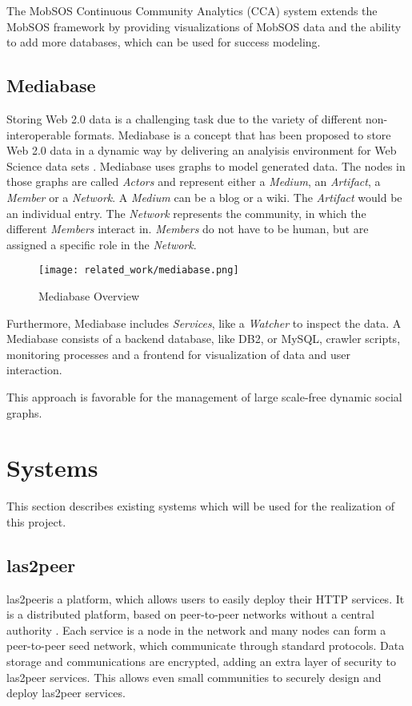 The MobSOS Continuous Community Analytics (CCA) system extends the MobSOS framework by providing visualizations of MobSOS data and the ability to add more databases, which can be used for success modeling.

\subsection{Mediabase}
Storing Web 2.0 data is a challenging task due to the variety of different non-interoperable formats.
Mediabase is a concept that has been proposed to store Web 2.0 data in a dynamic way by delivering an analyisis environment for Web Science data sets \cite{KlPe08}.
Mediabase uses graphs to model generated data.
The nodes in those graphs are called \emph{Actors} and represent either a \emph{ Medium}, an \emph{Artifact}, a \emph{Member} or a \emph{Network}.
A \emph{ Medium} can be a blog or a wiki.
The \emph{Artifact} would be an individual entry.
The \emph{Network} represents the community, in which the different \emph{Members} interact in.
\emph{Members} do not have to be human, but are assigned a specific role in the \emph{Network}.
\begin{figure}[h]
    \centering
    \texttt{[image: related\_work/mediabase.png]}
    \caption{Mediabase Overview \cite{Klam10e}}
\end{figure}
Furthermore, Mediabase includes \emph{Services}, like a \emph{Watcher} to inspect the data.
A Mediabase consists of a backend database, like DB2, or MySQL, crawler scripts, monitoring processes and a frontend for visualization of data and user interaction.

This approach is favorable for the management of large scale-free dynamic social graphs.

\section{Systems} \label{lab:systems}
This section describes existing systems which will be used for the realization of this project.

\subsection{las2peer}
las2peer\footnotemark is a platform, which allows users to easily deploy their HTTP services. 
It is a distributed platform, based on peer-to-peer networks without a central authority \cite{KRdJ16}.
Each service is a node in the network and many nodes can form a peer-to-peer seed network, which communicate through standard protocols. 
Data storage and communications are encrypted, adding an extra layer of security to las2peer services.
This allows even small communities to securely design and deploy las2peer services. 

